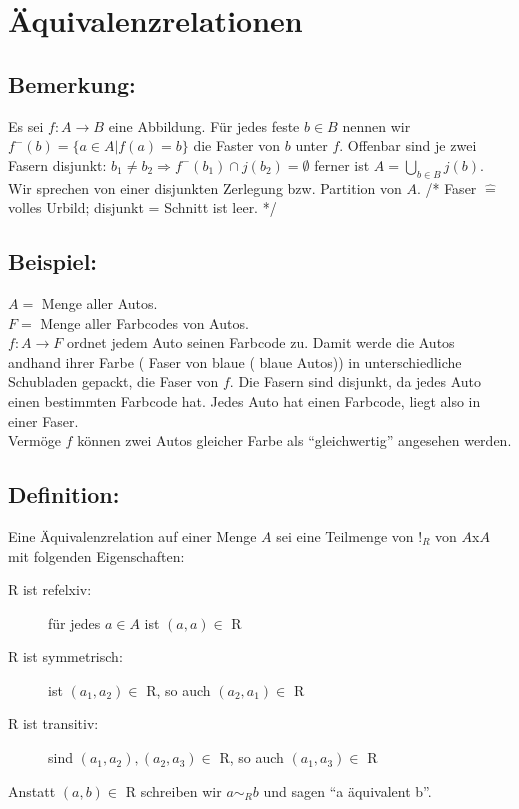 \section{Äquivalenzrelationen}

\subsection{Bemerkung:}
	Es sei $f: A \rightarrow B$ eine Abbildung. Für jedes feste $b \in B$ nennen wir $f^{-}(b) = \{ a \in A | f(a) = b\}$ die Faster von $b$ unter $f$. Offenbar sind je zwei Fasern disjunkt: $b_{1} \neq b_{2} \Longrightarrow f^{-} (b_{1}) \cap j(b_{2}) = \emptyset$ ferner ist $ A =  	\mathop{\bigcup}\limits_{b \in B} j(b)$. Wir sprechen von einer disjunkten Zerlegung bzw. Partition von $A$. /*  Faser $\mathrel{\widehat{=}}$ volles Urbild; disjunkt = Schnitt ist leer. */ 

\subsection{Beispiel:}
	$ A =$ Menge aller Autos. \\
	$ F =$ Menge aller Farbcodes von Autos.\\
	$f: A \rightarrow F$ ordnet jedem Auto seinen Farbcode zu. Damit werde die Autos andhand ihrer Farbe ( Faser von blaue ( blaue Autos)) in unterschiedliche Schubladen gepackt, die Faser von $f$. Die Fasern sind disjunkt, da jedes Auto einen bestimmten Farbcode hat. Jedes Auto hat einen Farbcode, liegt also in einer Faser. \\
Vermöge $f$ können zwei Autos gleicher Farbe als "`gleichwertig"' angesehen werden. 

\subsection{Definition:}
Eine Äquivalenzrelation auf einer Menge $A$ sei eine Teilmenge von $!_{R}$ von $A$x$A$ mit folgenden Eigenschaften:
\begin{description}

	\item[R ist refelxiv:] für jedes $a \in A$ ist $(a,a) \in $ R
	\item[R ist symmetrisch:] ist $(a_{1}, a_{2}) \in $ R, so auch $(a_{2},a_{1}) \in$ R
	\item[R ist transitiv:] sind $(a_{1}, a_{2}),(a_{2}, a_{3}) \in$ R, so auch $(a_{1},a_{3}) \in$ R

\end{description}
Anstatt $(a,b) \in$ R schreiben wir $a \sim_{R} b$ und sagen "`a äquivalent b"'.


